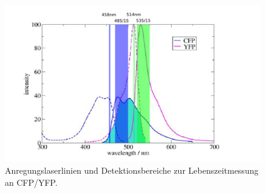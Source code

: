 \begin{figure}[h]
    \centering
    \includegraphics[scale=0.5]{Bilder/Protokoll.PNG}
    \caption{Anregungslaserlinien und Detektionsbereiche zur Lebenszeitmessung an CFP/YFP. }
    \label{fig:laserlinien}
   \end{figure}

